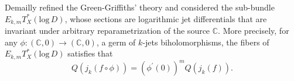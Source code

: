 \documentclass[english, 12pt]{amsart}
\def\log{\mathrm{log}\,}
\theoremstyle{plain}
\theoremstyle{remark}
\numberwithin{equation}{section}
\theoremstyle{plain}
\newcommand{\thistheoremname}{}
\newtheorem*{genericthm*}{\thistheoremname}
\newenvironment{namedthm*}[1]{\renewcommand{\thistheoremname}{#1}%
\begin{genericthm*}}
{\end{genericthm*}}
\theoremstyle{named}
\begin{document}
Demailly \cite{Demailly97} refined the Green-Griffiths' theory and considered the sub-bundle $E_{k,m}T^*_X(\log D)$, whose sections are logarithmic jet differentials that are invariant under arbitrary reparametrization of the source $\mathbb{C}$. More precisely, for any $\phi\colon \left(\mathbb{C},0\right)\to \left(\mathbb{C},0\right)$, a germ of $k$-jets biholomorphisms, the fibers of  $E_{k,m}T^*_X(\log D)$ satisfies that
\[Q(j_k(f\circ{\phi}))
=
\left(\phi^\prime (0)\right)^m
Q(j_k(f))
.\]
\end{document}
